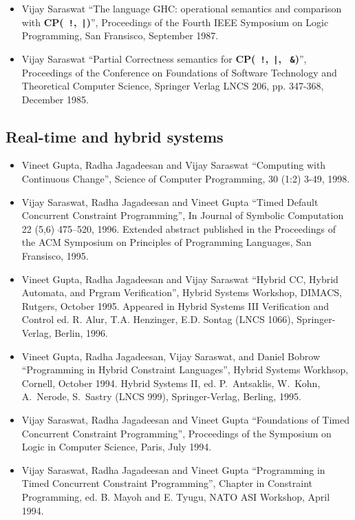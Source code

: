 \documentclass{article}
\begin{document}
\begin{itemize}
\item  Vijay Saraswat ``The language GHC: operational semantics
  and comparison with \textbf{CP(\texttt{ !},\texttt{ |})}'', Proceedings of the
  Fourth IEEE Symposium on Logic Programming, San Fransisco,
  September 1987.
  
\item  Vijay Saraswat ``Partial Correctness semantics for \textbf{
  CP(\texttt{ !},\texttt{ |}, \texttt{ \&})}'', Proceedings of the Conference on
  Foundations of Software Technology and Theoretical Computer
  Science, Springer Verlag LNCS 206, pp. 347-368, December 1985.
\end{itemize}
\subsection*{Real-time and hybrid systems}
\begin{itemize} 
\item  Vineet Gupta, Radha Jagadeesan and Vijay Saraswat
  ``Computing with Continuous Change'',  Science of
  Computer Programming, 30 (1:2) 3-49, 1998.

\item  Vijay Saraswat, Radha Jagadeesan and Vineet Gupta
  ``Timed Default Concurrent Constraint Programming'', In Journal of
  Symbolic Computation 22 (5,6) 475--520, 1996. Extended abstract
  published in the Proceedings of the ACM Symposium on Principles of
  Programming Languages, San Fransisco, 1995.
  
\item  Vineet Gupta, Radha Jagadeesan and Vijay Saraswat
  ``Hybrid CC, Hybrid Automata, and Prgram Verification'', Hybrid
  Systems Workshop, DIMACS, Rutgers, October 1995. Appeared in Hybrid
  Systems III Verification and Control ed.{} R. Alur, T.A.{}
  Henzinger, E.D.{} Sontag (LNCS 1066), Springer-Verlag, Berlin, 1996.

\item  Vineet Gupta, Radha Jagadeesan, Vijay Saraswat, and Daniel
  Bobrow ``Programming in Hybrid Constraint Languages'', Hybrid
  Systems Workhsop, Cornell, October 1994. Hybrid Systems II, ed.{}
  P.~Antsaklis, W.~Kohn, A.~Nerode, S.~Sastry (LNCS 999),
  Springer-Verlag, Berling, 1995.

\item  Vijay Saraswat, Radha Jagadeesan and Vineet Gupta
  ``Foundations of Timed Concurrent Constraint Programming'',
  Proceedings of the Symposium on Logic in Computer Science, Paris,
  July 1994.
  
\item  Vijay Saraswat, Radha Jagadeesan and Vineet Gupta
  ``Programming in Timed Concurrent Constraint Programming'',
  Chapter in Constraint Programming, ed.{} B. Mayoh and E. Tyugu,
  NATO ASI Workshop, April 1994.
\end{itemize}
\end{document}
